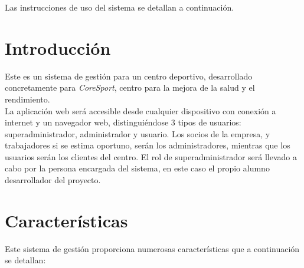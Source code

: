

Las instrucciones de uso del sistema se detallan a continuación.

\section{Introducción}

Este es un sistema de gestión para un centro deportivo, desarrollado concretamente para \textit{CoreSport}, centro para la mejora de la salud y el rendimiento. \\

La aplicación web será accesible desde cualquier dispositivo con conexión a internet y un navegador web, distinguiéndose 3 tipos de usuarios: superadministrador, administrador y usuario. Los socios de la empresa, y trabajadores si se estima oportuno, serán los administradores, mientras que los usuarios serán los clientes del centro. El rol de superadministrador será llevado a cabo por la persona encargada del sistema, en este caso el propio alumno desarrollador del proyecto. 


\section{Características}

Este sistema de gestión proporciona numerosas características que a continuación se detallan: 

